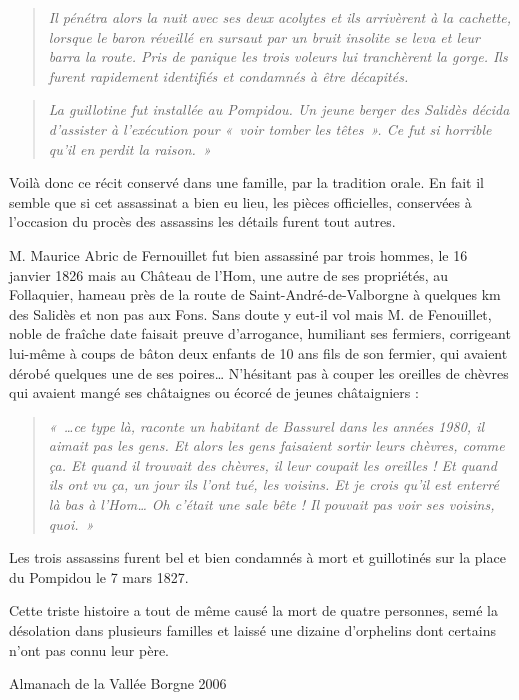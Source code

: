 \begin{quote}
\textit{Il pénétra alors la nuit avec ses deux acolytes et ils arrivèrent à la cachette, lorsque le baron
réveillé en sursaut par un bruit insolite se leva et leur barra la route. Pris de panique les trois
voleurs lui tranchèrent la gorge. Ils furent rapidement identifiés et condamnés à être
décapités.}
\end{quote}

\begin{quote}
\textit{La guillotine fut installée au Pompidou. Un jeune berger des Salidès décida d’assister à
l’exécution pour «~voir tomber les têtes~». Ce fut si horrible qu’il en perdit la raison.~»}
\end{quote}

Voilà donc ce récit conservé dans une famille, par la tradition orale. En fait il semble que si
cet assassinat a bien eu lieu, les pièces officielles, conservées à l’occasion du procès des
assassins les détails furent tout autres.

M. Maurice Abric de Fernouillet fut bien assassiné par trois hommes, le 16 janvier 1826 mais
au Château de l’Hom, une autre de ses propriétés, au Follaquier, hameau près de la route de
Saint-André-de-Valborgne à quelques km des Salidès et non pas aux Fons.
Sans doute y eut-il vol mais M. de Fenouillet, noble de fraîche date faisait preuve
d’arrogance, humiliant ses fermiers, corrigeant lui-même à coups de bâton deux enfants de 10
ans fils de son fermier, qui avaient dérobé quelques une de ses poires… N’hésitant pas à
couper les oreilles de chèvres qui avaient mangé ses châtaignes ou écorcé de jeunes
châtaigniers :

\begin{quote}
\textit{«~…ce type là, raconte un habitant de Bassurel dans les années 1980, il aimait pas les gens.
Et alors les gens faisaient sortir leurs chèvres, comme ça. Et quand il trouvait des chèvres, il
leur coupait les oreilles ! Et quand ils ont vu ça, un jour ils l’ont tué, les voisins. Et je crois
qu’il est enterré là bas à l’Hom… Oh c’était une sale bête ! Il pouvait pas voir ses voisins,
quoi.~»}
\end{quote}

Les trois assassins furent bel et bien condamnés à mort et guillotinés sur la place du
Pompidou le 7 mars 1827.

Cette triste histoire a tout de même causé la mort de quatre personnes, semé la désolation dans
plusieurs familles et laissé une dizaine d’orphelins dont certains n’ont pas connu leur père.

\begin{flushright}
Almanach de la Vallée Borgne 2006
\end{flushright}
